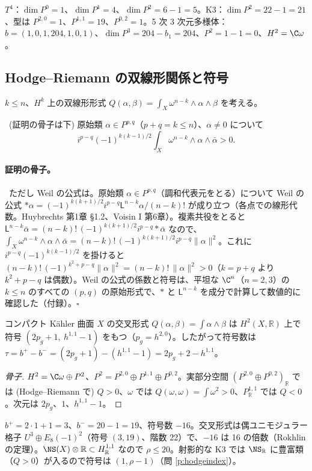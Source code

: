 \begin{ex}[$T^4$、K3、5 次超曲面の原始分解]
$T^4$：$\dim P^0=1$、$\dim P^1=4$、$\dim P^2=6-1=5$。K3：$\dim P^2=22-1=21$、型は $P^{2,0}=1$、$P^{1,1}=19$、$P^{0,2}=1$。5 次 3 次元多様体：$b=(1,0,1,204,1,0,1)$、$\dim P^3=204-b_1=204$、$P^2=1-1=0$、$H^2=\C\omega$。
\end{ex}

\subsection{Hodge--Riemann の双線形関係と符号}
$k\le n$、$H^k$ 上の双線形形式 $Q(\alpha,\beta)=\int_X\omega^{n-k}\wedge\alpha\wedge\beta$ を考える。
\begin{thm}\label{thm:HR}\tC\ (証明の骨子は下)
原始類 $\alpha\in P^{p,q}$（$p+q=k\le n$）、$\alpha\ne0$ について
\[
i^{p-q}(-1)^{k(k-1)/2}\int_X\omega^{n-k}\wedge\alpha\wedge\bar\alpha>0 .
\]
\end{thm}
\paragraph{証明の骨子。}\tP\ ただし Weil の公式は\tC。原始類 $\alpha\in P^{p,q}$（調和代表元をとる）について Weil の公式 $\ast\alpha=(-1)^{k(k+1)/2}i^{p-q}\mathsf L^{n-k}\alpha/(n-k)!$ が成り立つ（各点での線形代数。Huybrechts 第1章 \S1.2、Voisin I 第6章）。複素共役をとると $\mathsf L^{n-k}\bar\alpha=(n-k)!\,(-1)^{k(k+1)/2}i^{p-q}\ast\bar\alpha$ なので、$\int_X\omega^{n-k}\wedge\alpha\wedge\bar\alpha=(n-k)!\,(-1)^{k(k+1)/2}i^{p-q}\|\alpha\|^2$。これに $i^{p-q}(-1)^{k(k-1)/2}$ を掛けると $(n-k)!\,(-1)^{k^2+p-q}\|\alpha\|^2=(n-k)!\,\|\alpha\|^2>0$（$k=p+q$ より $k^2+p-q$ は偶数）。Weil の公式の係数と符号は、平坦な $\C^n$（$n=2,3$）の $k\le n$ のすべての $(p,q)$ の原始形式で、$\ast$ と $\mathsf L^{n-k}$ を成分で計算して数値的に確認した（付録）。\hfill$\square$
\begin{cor}\label{cor:hodgeindex}\tC
コンパクト Kähler 曲面 $X$ の交叉形式 $Q(\alpha,\beta)=\int\alpha\wedge\beta$ は $H^2(X,\mathbb R)$ 上で符号 $(2p_g+1,\ h^{1,1}-1)$ をもつ（$p_g=h^{2,0}$）。したがって符号数は $\tau=b^+-b^-=(2p_g+1)-(h^{1,1}-1)=2p_g+2-h^{1,1}$。
\end{cor}
\begin{proof}[骨子]
$H^2=\C\omega\oplus P^2$、$P^2=P^{2,0}\oplus P^{1,1}\oplus P^{0,2}$。実部分空間 $(P^{2,0}\oplus P^{0,2})_{\mathbb R}$ では (Hodge--Riemann で) $Q>0$、$\omega$ では $Q(\omega,\omega)=\int\omega^2>0$、$P^{1,1}_{\mathbb R}$ では $Q<0$。次元は $2p_g$、$1$、$h^{1,1}-1$。
\end{proof}
\begin{ex}[K3]
$b^+=2\cdot1+1=3$、$b^-=20-1=19$、符号数 $-16$。交叉形式は偶ユニモジュラー格子 $U^3\oplus E_8(-1)^2$（符号 $(3,19)$、階数 22）で、$-16$ は 16 の倍数（Rokhlin の定理\tC）。$\NS(X)\otimes\mathbb R\subset H^{1,1}_{\mathbb R}$ なので $\rho\le20$。射影的な K3 では $\NS_{\mathbb R}$ に豊富類（$Q>0$）が入るので符号は $(1,\rho-1)$（問 \ref{p:hodgeindex}）。
\end{ex}

